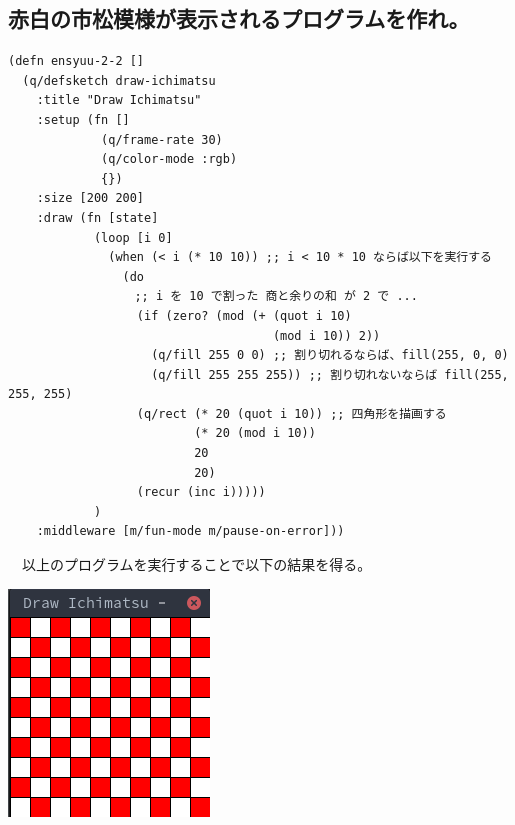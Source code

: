 \documentclass{scrartcl}
\begin{document}
\subsection{赤白の市松模様が表示されるプログラムを作れ。}
\label{sec:org69f4533}
\begin{verbatim}
(defn ensyuu-2-2 []
  (q/defsketch draw-ichimatsu
    :title "Draw Ichimatsu"
    :setup (fn []
             (q/frame-rate 30)
             (q/color-mode :rgb)
             {})
    :size [200 200]
    :draw (fn [state]
            (loop [i 0]
              (when (< i (* 10 10)) ;; i < 10 * 10 ならば以下を実行する
                (do
　                ;; i を 10 で割った 商と余りの和 が 2 で ...
                  (if (zero? (mod (+ (quot i 10) 
                                     (mod i 10)) 2))
                    (q/fill 255 0 0) ;; 割り切れるならば、fill(255, 0, 0)
                    (q/fill 255 255 255)) ;; 割り切れないならば fill(255, 255, 255)
                  (q/rect (* 20 (quot i 10)) ;; 四角形を描画する
                          (* 20 (mod i 10))
                          20
                          20)
                  (recur (inc i)))))
            )
    :middleware [m/fun-mode m/pause-on-error]))   
\end{verbatim}
　以上のプログラムを実行することで以下の結果を得る。\\
\begin{center}
\includegraphics[width=0.3\linewidth]{./img/ensyuu3.png}
\end{center}
\end{document}
